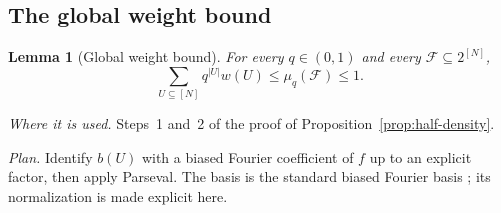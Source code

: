 \documentclass[11pt,letterpaper]{article}
\newtheorem{lemma}[theorem]{Lemma}
\theoremstyle{definition}
\theoremstyle{remark}
\numberwithin{equation}{section}
\begin{document}
\subsection{The global weight bound}

\begin{lemma}[Global weight bound]\label{lem:global}
For every $q\in(0,1)$ and every $\mathcal F\subseteq2^{[N]}$,
\begin{equation}\label{eq:global-weight-bound}
 \sum_{U\subseteq[N]}q^{|U|}w(U)\le\mu_q(\mathcal F)\le1 .
\end{equation}
\end{lemma}

\emph{Where it is used.} Steps~1 and~2 of the proof of
Proposition~\ref{prop:half-density}.

\emph{Plan.} Identify $b(U)$ with a biased Fourier coefficient of $f$ up to
an explicit factor, then apply Parseval. The basis is the standard biased
Fourier basis \cite[Section~8.4]{ODonnell14}; its normalization is made
explicit here.
\end{document}
